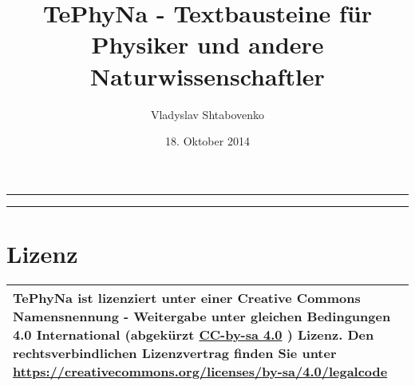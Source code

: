 \documentclass[../tephyna.tex]{subfiles}
\begin{document}
\makeatletter
\def\thickhrulefill{\leavevmode \leaders \hrule height 1pt\hfill \kern \z@}
\def\maketitle{
  \null
  \thispagestyle{empty}
  \vskip 1cm
  \begin{flushright}
    \normalfont\Large\@author
  \end{flushright}
  \vfil
  \hrule height 2pt
  \par
  \begin{center}
    \huge \strut \@title \par
  \end{center}
  \hrule height 2pt
  \par
  \vfil
  \begin{center}
    \large \strut \@date \par
  \end{center}
  \vfil
  \null
  \cleardoublepage
  }
\makeatother
\author{Vladyslav Shtabovenko}
\title{TePhyNa - Textbausteine für Physiker und andere Naturwissenschaftler}
\date{18. Oktober 2014}
\maketitle


\section*{Lizenz}
\begin{tabular}{|p{}|}
 \hline
 TePhyNa ist lizenziert unter einer Creative Commons Namensnennung - Weitergabe unter gleichen Bedingungen 4.0 International (abgekürzt \href{https://creativecommons.org/licenses/by-sa/4.0/deed.de}{CC-by-sa 4.0} ) Lizenz. Den rechtsverbindlichen Lizenzvertrag finden Sie unter
\url{https://creativecommons.org/licenses/by-sa/4.0/legalcode} \\
 \hline
 \end{tabular}
\end{document}
